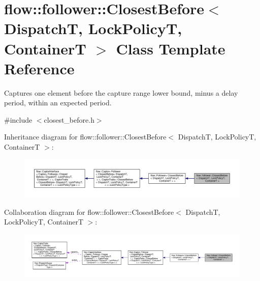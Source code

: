 \hypertarget{classflow_1_1follower_1_1_closest_before}{}\section{flow\+:\+:follower\+:\+:Closest\+Before$<$ DispatchT, Lock\+PolicyT, ContainerT $>$ Class Template Reference}
\label{classflow_1_1follower_1_1_closest_before}


Captures one element before the capture range lower bound, minus a delay period, within an expected period.  




{\ttfamily \#include $<$closest\+\_\+before.\+h$>$}



Inheritance diagram for flow\+:\+:follower\+:\+:Closest\+Before$<$ DispatchT, Lock\+PolicyT, ContainerT $>$\+:\nopagebreak
\begin{figure}[H]
\begin{center}
\leavevmode
\includegraphics[width=350pt]{classflow_1_1follower_1_1_closest_before__inherit__graph}
\end{center}
\end{figure}


Collaboration diagram for flow\+:\+:follower\+:\+:Closest\+Before$<$ DispatchT, Lock\+PolicyT, ContainerT $>$\+:\nopagebreak
\begin{figure}[H]
\begin{center}
\leavevmode
\includegraphics[width=350pt]{classflow_1_1follower_1_1_closest_before__coll__graph}
\end{center}
\end{figure}
